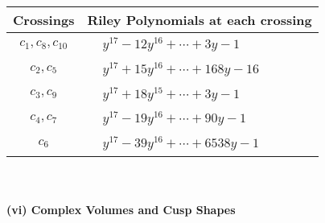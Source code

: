 \documentclass[1p]{elsarticle_modified}
\theoremstyle{definition}
\begin{document}
\begin{tabular}{m{50pt}|m{274pt}}
Crossings & \hspace{64pt}Riley Polynomials at each crossing \\
\hline $$\begin{aligned}c_{1},c_{8},c_{10}\end{aligned}$$&$\begin{aligned}
&y^{17}-12 y^{16}+\cdots+3 y-1
\end{aligned}$\\
\hline $$\begin{aligned}c_{2},c_{5}\end{aligned}$$&$\begin{aligned}
&y^{17}+15 y^{16}+\cdots+168 y-16
\end{aligned}$\\
\hline $$\begin{aligned}c_{3},c_{9}\end{aligned}$$&$\begin{aligned}
&y^{17}+18 y^{15}+\cdots+3 y-1
\end{aligned}$\\
\hline $$\begin{aligned}c_{4},c_{7}\end{aligned}$$&$\begin{aligned}
&y^{17}-19 y^{16}+\cdots+90 y-1
\end{aligned}$\\
\hline $$\begin{aligned}c_{6}\end{aligned}$$&$\begin{aligned}
&y^{17}-39 y^{16}+\cdots+6538 y-1
\end{aligned}$\\
\hline
\end{tabular}\\~\\
\newpage\flushleft \textbf{(vi) Complex Volumes and Cusp Shapes}
\end{document}
